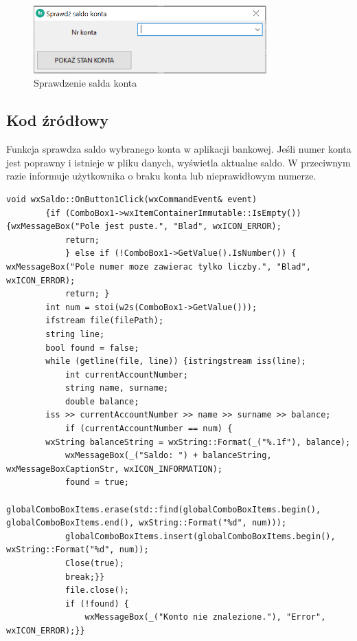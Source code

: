 \documentclass[a4paper,12pt]{article}
\begin{document}
\begin{figure}[h]
	\centering
	\includegraphics[width=0.8\textwidth]{saldo.png}
	\caption{Sprawdzenie salda konta}
	\label{saldo}
\end{figure}
\newpage
\subsection{Kod źródłowy}

Funkcja sprawdza saldo wybranego konta w aplikacji bankowej. Jeśli numer konta jest poprawny i istnieje w pliku danych, wyświetla aktualne saldo. W przeciwnym razie informuje użytkownika o braku konta lub nieprawidłowym numerze.
	\begin{lstlisting}
void wxSaldo::OnButton1Click(wxCommandEvent& event)
		{if (ComboBox1->wxItemContainerImmutable::IsEmpty()) {wxMessageBox("Pole jest puste.", "Blad", wxICON_ERROR);
			return;
			} else if (!ComboBox1->GetValue().IsNumber()) { wxMessageBox("Pole numer moze zawierac tylko liczby.", "Blad", wxICON_ERROR);
			return; }
		int num = stoi(w2s(ComboBox1->GetValue()));
		ifstream file(filePath);
		string line;
		bool found = false;
		while (getline(file, line)) {istringstream iss(line);
			int currentAccountNumber;
			string name, surname;
			double balance;
		iss >> currentAccountNumber >> name >> surname >> balance;
			if (currentAccountNumber == num) {
		wxString balanceString = wxString::Format(_("%.1f"), balance);
			wxMessageBox(_("Saldo: ") + balanceString, wxMessageBoxCaptionStr, wxICON_INFORMATION);
			found = true;
			globalComboBoxItems.erase(std::find(globalComboBoxItems.begin(), globalComboBoxItems.end(), wxString::Format("%d", num)));
			globalComboBoxItems.insert(globalComboBoxItems.begin(), wxString::Format("%d", num));
			Close(true);
			break;}}
			file.close();
			if (!found) {
				wxMessageBox(_("Konto nie znalezione."), "Error", wxICON_ERROR);}}
	\end{lstlisting}
\newpage
\end{document}
